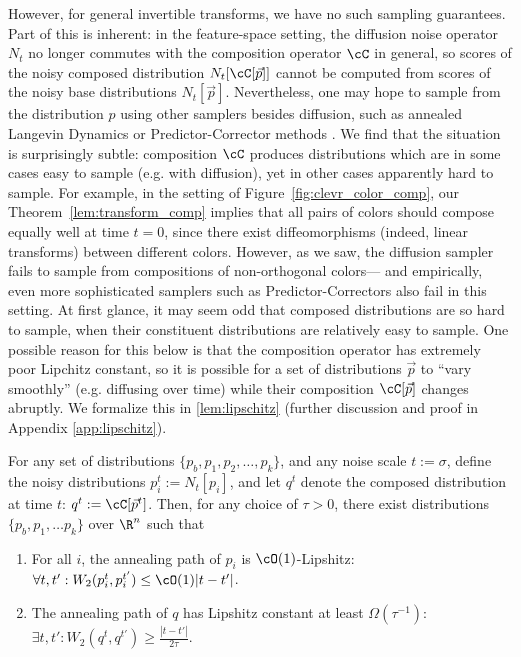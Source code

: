 However, for general invertible transforms, we have no such sampling guarantees.
Part of this is inherent: in the feature-space setting, the 
diffusion noise operator $N_t$ no longer commutes
with the composition operator $\cC$ in general,
 so scores of the noisy composed 
distribution $N_t[\cC[\vec{p}]]$
cannot be computed from scores
of the noisy base distributions $N_t[\vec{p}]$.
Nevertheless, one may hope to sample from the distribution $\hat{p}$
using other samplers besides diffusion, 
such as annealed Langevin Dynamics
or
Predictor-Corrector methods \citep{song2020score}.
We find that the situation is surprisingly subtle:
composition $\cC$ produces distributions which
are in some cases easy to sample (e.g. with diffusion),
yet in other cases apparently hard to sample.
For example, in the
setting of Figure~\ref{fig:clevr_color_comp}, 
our Theorem~\ref{lem:transform_comp} implies
that all pairs of colors should compose equally well
at time $t=0$, since there exist diffeomorphisms
(indeed, linear transforms) between different colors.
However, as we saw,
the diffusion sampler
fails to sample from compositions 
of non-orthogonal colors--- and 
empirically, even more sophisticated
samplers such as Predictor-Correctors
also fail in this setting.
At first glance, it may seem odd that
composed distributions are so hard to sample,
when their constituent distributions are relatively easy to sample.
One possible reason for this below is that the composition operator has extremely poor Lipchitz constant,
so it is possible for a set of distributions $\vec{p}$ to ``vary smoothly''
(e.g. diffusing over time) while their composition $\cC[\vec{p}]$
changes abruptly.
We formalize this in \cref{lem:lipschitz} (further discussion and proof in Appendix \ref{app:lipschitz}).
\begin{lemma}
\label{lem:lipschitz}
For any set of distributions $\{p_b, p_1, p_2, \dots, p_k\}$,
and any noise scale $t := \sigma$,
define the noisy distributions 
$p_i^t := N_{t}[p_i]$,
and let $q^t$ denote the composed distribution at time $t$: $q^t := \cC[\vec{p}^t]$. Then, for any choice of $\tau > 0$,
there exist distributions $\{p_b, p_1, \dots p_k\}$ over $\R^n$
such that
\begin{enumerate}
    \setlength{\itemsep}{0pt}
    \item For all $i$, the annealing path of $p_i$ is 
    $\cO(1)$-Lipshitz:
    $\forall t, t': W_2(p_i^{t}, p_i^{t'}) \leq \cO(1) |t - t'|$.
    \item The annealing path of $q$ has Lipshitz constant
    at least $\Omega(\tau^{-1})$:
    $\exists t, t': W_2(q^{t}, q^{t'}) \geq \frac{|t - t'|}{2\tau}.$
\end{enumerate}
\end{lemma}


